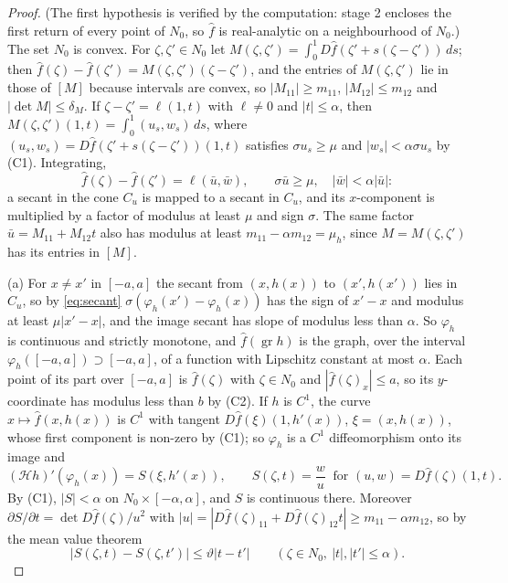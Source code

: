 \documentclass[11pt]{article}
\theoremstyle{definition}
\begin{document}
\begin{proof}
(The first hypothesis is verified by the computation: stage 2 encloses the first return of every point of $N_0$, so $\hat f$ is real-analytic on a neighbourhood of $N_0$.) The set $N_0$ is convex. For $\zeta, \zeta' \in N_0$ let $M(\zeta, \zeta') = \int_0^1 D\hat f(\zeta' + s(\zeta - \zeta'))\,ds$; then $\hat f(\zeta) - \hat f(\zeta') = M(\zeta, \zeta')(\zeta - \zeta')$, and the entries of $M(\zeta, \zeta')$ lie in those of $[M]$ because intervals are convex, so $|M_{11}| \ge m_{11}$, $|M_{12}| \le m_{12}$ and $|\det M| \le \delta_M$. If $\zeta - \zeta' = \ell(1, t)$ with $\ell \ne 0$ and $|t| \le \alpha$, then $M(\zeta, \zeta')(1, t) = \int_0^1 (u_s, w_s)\,ds$, where $(u_s, w_s) = D\hat f(\zeta' + s(\zeta - \zeta'))(1, t)$ satisfies $\sigma u_s \ge \mu$ and $|w_s| < \alpha\sigma u_s$ by (C1). Integrating,
\begin{equation}\label{eq:secant}
  \hat f(\zeta) - \hat f(\zeta') = \ell(\bar u, \bar w), \qquad \sigma\bar u \ge \mu, \quad |\bar w| < \alpha|\bar u| :
\end{equation}
a secant in the cone $C_u$ is mapped to a secant in $C_u$, and its $x$-component is multiplied by a factor of modulus at least $\mu$ and sign $\sigma$. The same factor $\bar u = M_{11} + M_{12}t$ also has modulus at least $m_{11} - \alpha m_{12} = \mu_h$, since $M = M(\zeta, \zeta')$ has its entries in $[M]$.

(a) For $x \ne x'$ in $[-a, a]$ the secant from $(x, h(x))$ to $(x', h(x'))$ lies in $C_u$, so by \eqref{eq:secant} $\sigma(\varphi_h(x') - \varphi_h(x))$ has the sign of $x' - x$ and modulus at least $\mu|x' - x|$, and the image secant has slope of modulus less than $\alpha$. So $\varphi_h$ is continuous and strictly monotone, and $\hat f(\operatorname{gr}h)$ is the graph, over the interval $\varphi_h([-a, a]) \supset [-a, a]$, of a function with Lipschitz constant at most $\alpha$. Each point of its part over $[-a, a]$ is $\hat f(\zeta)$ with $\zeta \in N_0$ and $|\hat f(\zeta)_x| \le a$, so its $y$-coordinate has modulus less than $b$ by (C2). If $h$ is $C^1$, the curve $x \mapsto \hat f(x, h(x))$ is $C^1$ with tangent $D\hat f(\xi)(1, h'(x))$, $\xi = (x, h(x))$, whose first component is non-zero by (C1); so $\varphi_h$ is a $C^1$ diffeomorphism onto its image and
\begin{equation}\label{eq:slope}
  (\mathcal H h)'(\varphi_h(x)) = S(\xi, h'(x)), \qquad S(\zeta, t) = \frac{w}{u} \ \text{ for } (u, w) = D\hat f(\zeta)(1, t).
\end{equation}
By (C1), $|S| < \alpha$ on $N_0 \times [-\alpha, \alpha]$, and $S$ is continuous there. Moreover $\partial S/\partial t = \det D\hat f(\zeta)/u^2$ with $|u| = |D\hat f(\zeta)_{11} + D\hat f(\zeta)_{12}t| \ge m_{11} - \alpha m_{12}$, so by the mean value theorem
\begin{equation}\label{eq:slopecontr}
  |S(\zeta, t) - S(\zeta, t')| \le \vartheta|t - t'| \qquad (\zeta \in N_0,\ |t|, |t'| \le \alpha).
\end{equation}


\end{proof}
\end{document}

